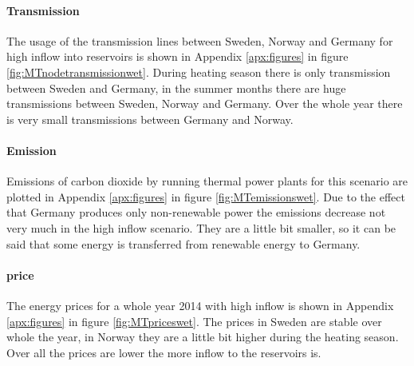 \documentclass{article}
\begin{document}
\paragraph{Transmission\\}
The usage of the transmission lines between Sweden, Norway and Germany for high inflow into reservoirs is shown in Appendix \ref{apx:figures} in figure \ref{fig:MTnodetransmissionwet}. During heating season there is only transmission between Sweden and Germany, in the summer months there are huge transmissions between Sweden, Norway and Germany. Over the whole year there is very small transmissions between Germany and Norway.

\paragraph{Emission\\}
Emissions of carbon dioxide by running thermal power plants for this scenario are plotted in Appendix \ref{apx:figures} in figure \ref{fig:MTemissionswet}. Due to the effect that Germany produces only non-renewable power the emissions decrease not very much in the high inflow scenario. They are a little bit smaller, so it can be said that some energy is transferred from renewable energy to Germany. 

\paragraph{price\\}
The energy prices for a whole year 2014 with high inflow is shown in Appendix \ref{apx:figures} in figure \ref{fig:MTpriceswet}. The prices in Sweden are stable over whole the year, in Norway they are a little bit higher during the heating season. Over all the prices are lower the more inflow to the reservoirs is.

\end{document}
